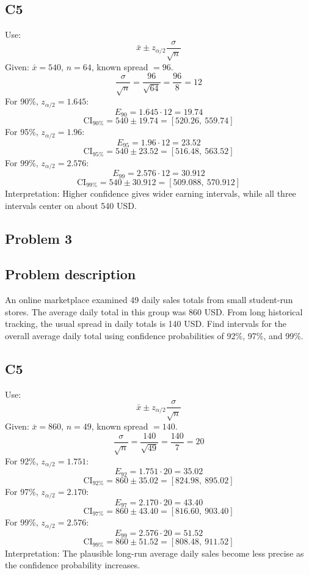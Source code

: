 \begin{ExamProblems}
		\subsection*{C5}
		Use:
		\[
		\bar{x} \pm z_{\alpha/2}\frac{\sigma}{\sqrt{n}}
		\]
		Given: $\bar{x}=540$, $n=64$, known spread $=96$.
		\[
		\frac{\sigma}{\sqrt{n}}=\frac{96}{\sqrt{64}}=\frac{96}{8}=12
		\]
		For 90\%, $z_{\alpha/2}=1.645$:
		\[
		E_{90}=1.645\cdot 12=19.74
		\]
		\[
		\text{CI}_{90\%}=540\pm 19.74=[520.26,\ 559.74]
		\]
		For 95\%, $z_{\alpha/2}=1.96$:
		\[
		E_{95}=1.96\cdot 12=23.52
		\]
		\[
		\text{CI}_{95\%}=540\pm 23.52=[516.48,\ 563.52]
		\]
		For 99\%, $z_{\alpha/2}=2.576$:
		\[
		E_{99}=2.576\cdot 12=30.912
		\]
		\[
		\text{CI}_{99\%}=540\pm 30.912=[509.088,\ 570.912]
		\]
		Interpretation: Higher confidence gives wider earning intervals, while all three intervals center on about 540 USD.

		\newpage
		\item
		\subsection*{Problem 3}
		\subsection*{Problem description}
		An online marketplace examined 49 daily sales totals from small student-run stores.
		The average daily total in this group was 860 USD.
		From long historical tracking, the usual spread in daily totals is 140 USD.
		Find intervals for the overall average daily total using confidence probabilities of 92\%, 97\%, and 99\%.

		\subsection*{C5}
		Use:
		\[
		\bar{x} \pm z_{\alpha/2}\frac{\sigma}{\sqrt{n}}
		\]
		Given: $\bar{x}=860$, $n=49$, known spread $=140$.
		\[
		\frac{\sigma}{\sqrt{n}}=\frac{140}{\sqrt{49}}=\frac{140}{7}=20
		\]
		For 92\%, $z_{\alpha/2}=1.751$:
		\[
		E_{92}=1.751\cdot 20=35.02
		\]
		\[
		\text{CI}_{92\%}=860\pm 35.02=[824.98,\ 895.02]
		\]
		For 97\%, $z_{\alpha/2}=2.170$:
		\[
		E_{97}=2.170\cdot 20=43.40
		\]
		\[
		\text{CI}_{97\%}=860\pm 43.40=[816.60,\ 903.40]
		\]
		For 99\%, $z_{\alpha/2}=2.576$:
		\[
		E_{99}=2.576\cdot 20=51.52
		\]
		\[
		\text{CI}_{99\%}=860\pm 51.52=[808.48,\ 911.52]
		\]
		Interpretation: The plausible long-run average daily sales become less precise as the confidence probability increases.


\end{ExamProblems}
